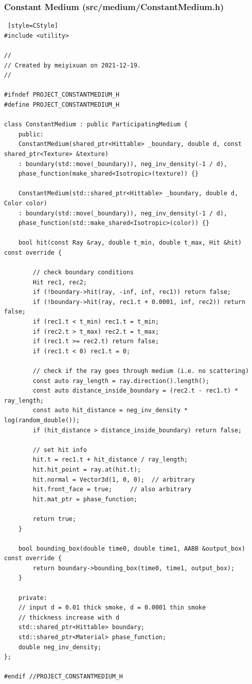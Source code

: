 \documentclass[utf8]{article}
\begin{document}
\subsubsection*{Constant Medium (src/medium/ConstantMedium.h)}
\begin{lstlisting} [style=CStyle]
#include <utility>

//
// Created by meiyixuan on 2021-12-19.
//

#ifndef PROJECT_CONSTANTMEDIUM_H
#define PROJECT_CONSTANTMEDIUM_H

class ConstantMedium : public ParticipatingMedium {
	public:
	ConstantMedium(shared_ptr<Hittable> _boundary, double d, const shared_ptr<Texture> &texture)
	: boundary(std::move(_boundary)), neg_inv_density(-1 / d),
	phase_function(make_shared<Isotropic>(texture)) {}
	
	ConstantMedium(std::shared_ptr<Hittable> _boundary, double d, Color color)
	: boundary(std::move(_boundary)), neg_inv_density(-1 / d),
	phase_function(std::make_shared<Isotropic>(color)) {}
	
	bool hit(const Ray &ray, double t_min, double t_max, Hit &hit) const override {
		
		// check boundary conditions
		Hit rec1, rec2;
		if (!boundary->hit(ray, -inf, inf, rec1)) return false;
		if (!boundary->hit(ray, rec1.t + 0.0001, inf, rec2)) return false;
		if (rec1.t < t_min) rec1.t = t_min;
		if (rec2.t > t_max) rec2.t = t_max;
		if (rec1.t >= rec2.t) return false;
		if (rec1.t < 0) rec1.t = 0;
		
		// check if the ray goes through medium (i.e. no scattering)
		const auto ray_length = ray.direction().length();
		const auto distance_inside_boundary = (rec2.t - rec1.t) * ray_length;
		const auto hit_distance = neg_inv_density * log(random_double());
		if (hit_distance > distance_inside_boundary) return false;
		
		// set hit info
		hit.t = rec1.t + hit_distance / ray_length;
		hit.hit_point = ray.at(hit.t);
		hit.normal = Vector3d(1, 0, 0);  // arbitrary
		hit.front_face = true;     // also arbitrary
		hit.mat_ptr = phase_function;
		
		return true;
	}
	
	bool bounding_box(double time0, double time1, AABB &output_box) const override {
		return boundary->bounding_box(time0, time1, output_box);
	}
	
	private:
	// input d = 0.01 thick smoke, d = 0.0001 thin smoke
	// thickness increase with d
	std::shared_ptr<Hittable> boundary;
	std::shared_ptr<Material> phase_function;
	double neg_inv_density;
};

#endif //PROJECT_CONSTANTMEDIUM_H

\end{lstlisting}
\end{document}
